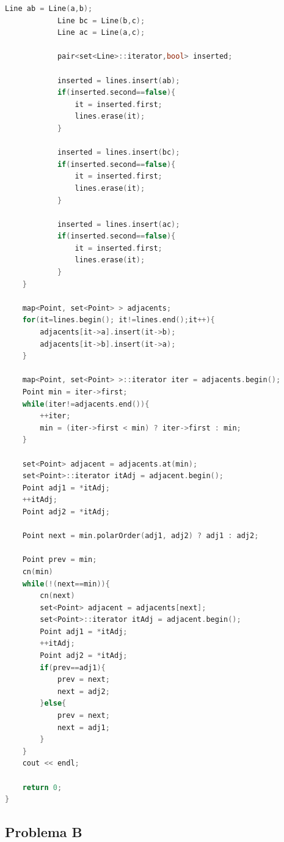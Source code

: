 \documentclass[a4paper]{article}
\begin{document}
\begin{lstlisting}[language=c++]
			Line ab = Line(a,b);
			Line bc = Line(b,c);
			Line ac = Line(a,c);

			pair<set<Line>::iterator,bool> inserted;
			 
			inserted = lines.insert(ab);
			if(inserted.second==false){
				it = inserted.first;
				lines.erase(it);
			}
			
			inserted = lines.insert(bc);
			if(inserted.second==false){
				it = inserted.first;			
				lines.erase(it);
			}
			
			inserted = lines.insert(ac);
			if(inserted.second==false){
				it = inserted.first;
				lines.erase(it);
			}
	}
	
	map<Point, set<Point> > adjacents;
	for(it=lines.begin(); it!=lines.end();it++){
		adjacents[it->a].insert(it->b);
		adjacents[it->b].insert(it->a);
	}
	
	map<Point, set<Point> >::iterator iter = adjacents.begin();
	Point min = iter->first;
	while(iter!=adjacents.end()){
		++iter;
		min = (iter->first < min) ? iter->first : min;
	}
	
	set<Point> adjacent = adjacents.at(min);
	set<Point>::iterator itAdj = adjacent.begin();
	Point adj1 = *itAdj;
	++itAdj;
	Point adj2 = *itAdj;
	
	Point next = min.polarOrder(adj1, adj2) ? adj1 : adj2;
	
	Point prev = min;
	cn(min)
	while(!(next==min)){
		cn(next)
		set<Point> adjacent = adjacents[next];
		set<Point>::iterator itAdj = adjacent.begin();
		Point adj1 = *itAdj;
		++itAdj;
		Point adj2 = *itAdj;
		if(prev==adj1){
			prev = next;
			next = adj2;
		}else{
			prev = next;
			next = adj1;
		}
	}
	cout << endl;
	
	return 0;
}
\end{lstlisting}

\newpage
\subsection{Problema B}
\end{document}

